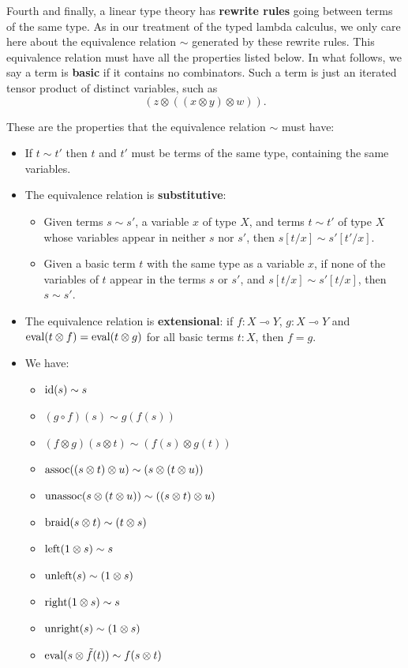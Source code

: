 \documentclass[12pt,twoside,openright]{report}
\newcommand{\lhom}{\multimap}
\newcommand{\tensor}{\otimes}
\newcommand{\Id}{{\rm id}}
\newcommand{\eval}{{\rm eval}}
\newcommand{\assoc}{{\rm assoc}}
\newcommand{\unassoc}{{\rm unassoc}}
\newcommand{\braid}{{\rm braid}}
\newcommand{\Left}{{\rm left}}
\newcommand{\Right}{{\rm right}}
\newcommand{\unright}{{\rm unright}}
\newcommand{\unleft}{{\rm unleft}}
\begin{document}
Fourth and finally, a linear type theory has {\bf rewrite rules} going between terms of the same type.  As in our treatment of the typed lambda calculus, we only care here about the equivalence relation
$\sim$ generated by these rewrite rules.  This equivalence relation must have all the properties listed below.  In what follows, we say a term is {\bf basic} if it contains no combinators.  Such a term is just an iterated tensor product of distinct variables, such as
\[              (z \tensor ((x \tensor y) \tensor w)) .\]

These are the properties that the equivalence relation $\sim$ must have:
\begin{itemize}
\item If $t \sim t'$ then $t$ and $t'$ must be terms of the same type, containing the same variables.
\item The equivalence relation is {\bf substitutive}: 
\begin{itemize} 
\item Given terms $s \sim s'$, a variable $x$ of type $X$, and terms $t \sim t'$ of type $X$ whose variables appear in neither $s$ nor $s'$, then $s[t/x] \sim s'[t'/x]$.  
\item Given a basic term $t$ with the same type as a variable
$x$, if none of the variables of $t$ appear in the terms
$s$ or $s'$, and $s[t/x] \sim s'[t/x]$, then $s \sim s'$.
\end{itemize}
\item The equivalence relation is {\bf extensional}: if 
$f : X \lhom Y$, $g: X \lhom Y$ and 
$\eval(t \tensor f) = \eval(t \tensor g)$ for all basic terms 
$t:X$, then $f = g$.  
\item We have:
    \begin{itemize}
      \item $\Id(s) \sim s$
      \item $(g \circ f)(s) \sim g(f(s))$
      \item $(f \tensor g)(s \tensor t) \sim (f(s)\tensor g(t))$
      \item $\assoc((s \tensor t) \tensor u) 
             \sim (s \tensor (t \tensor u))$
      \item $\unassoc(s \tensor (t \tensor u))
             \sim ((s \tensor t) \tensor u)$
      \item $\braid(s \tensor t) \sim (t \tensor s)$
      \item $\Left(1 \tensor s) \sim s$
      \item $\unleft(s) \sim (1 \tensor s)$
      \item $\Right(1 \tensor s) \sim s$
      \item $\unright(s) \sim (1 \tensor s)$
      \item $\eval(s \tensor \tilde{f}(t)) \sim f(s \tensor t)$
    \end{itemize}
\end{itemize}
\end{document}
